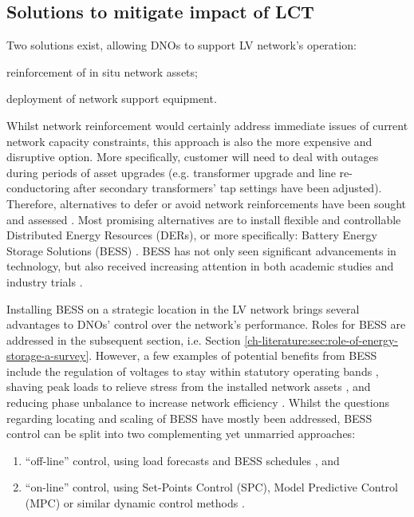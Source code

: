 \subsection{Solutions to mitigate impact of LCT}
\label{ch-introduction:subsec:solutions-to-mitigate-impact-of-lct}

Two solutions exist, allowing DNOs to support LV network's operation: 
\begin{enumerate*}
	\item reinforcement of in situ network assets;
	\item deployment of network support equipment.
\end{enumerate*}
Whilst network reinforcement would certainly address immediate issues of current network capacity constraints, this approach is also the more expensive and disruptive option.
More specifically, customer will need to deal with outages during periods of asset upgrades (e.g. transformer upgrade and line re-conductoring after secondary transformers' tap settings have been adjusted).
Therefore, alternatives to defer or avoid network reinforcements have been sought and assessed \cite{Harrison2007, Zangs2016a, VanderKlauw2016d, Greenwood2017}.
Most promising alternatives are to install flexible and controllable Distributed Energy Resources (DERs), or more specifically: Battery Energy Storage Solutions (BESS) \cite{Wade2010}.
BESS has not only seen significant advancements in technology, but also received increasing attention in both academic studies and industry trials \cite{Palizban2016}.

Installing BESS on a strategic location in the LV network brings several advantages to DNOs' control over the network's performance.
Roles for BESS are addressed in the subsequent section, i.e. Section \ref{ch-literature:sec:role-of-energy-storage-a-survey}.
However, a few examples of potential benefits from BESS include the regulation of voltages to stay within statutory operating bands \cite{Yang2014}, shaving peak loads to relieve stress from the installed network assets \cite{Bennett2015}, and reducing phase unbalance to increase network efficiency \cite{Wang2015b} .
Whilst the questions regarding locating and scaling of BESS have mostly been addressed, BESS control can be split into two complementing yet unmarried approaches:

\begin{enumerate}
	\item ``off-line'' control, using load forecasts and BESS schedules \cite{Cecati2011, Chaouachi2013, Palma-Behnke2013, Khodaei2014}, and
	\item ``on-line'' control, using Set-Points Control (SPC), Model Predictive Control (MPC) or similar dynamic control methods \cite{Salinas2013, Huang2013, Huang2014a, Sun2014a}.
\end{enumerate}

